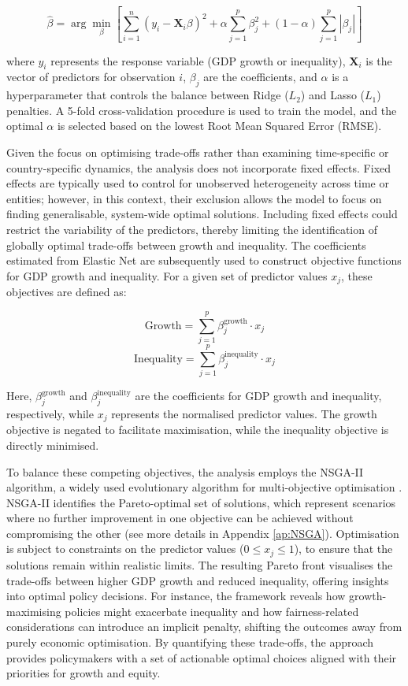 \documentclass[12pt]{article}
\begin{document}
\[
\hat{\beta} = \arg \min_{\beta} \left[ \sum_{i=1}^{n} \left( y_i - \mathbf{X}_i \beta \right)^2 + \alpha \sum_{j=1}^{p} \beta_j^2 + (1-\alpha) \sum_{j=1}^{p} |\beta_j| \right]
\]

where \(y_i\) represents the response variable (GDP growth or inequality), \(\mathbf{X}_i\) is the vector of predictors for observation \(i\), \(\beta_j\) are the coefficients, and \(\alpha\) is a hyperparameter that controls the balance between Ridge (\(L_2\)) and Lasso (\(L_1\)) penalties. A 5-fold cross-validation procedure is used to train the model, and the optimal \(\alpha\) is selected based on the lowest Root Mean Squared Error (RMSE).

Given the focus on optimising trade-offs rather than examining time-specific or country-specific dynamics, the analysis does not incorporate fixed effects. Fixed effects are typically used to control for unobserved heterogeneity across time or entities; however, in this context, their exclusion allows the model to focus on finding generalisable, system-wide optimal solutions. Including fixed effects could restrict the variability of the predictors, thereby limiting the identification of globally optimal trade-offs between growth and inequality. The coefficients estimated from Elastic Net are subsequently used to construct objective functions for GDP growth and inequality. For a given set of predictor values \(x_j\), these objectives are defined as:

\[
\text{Growth} = \sum_{j=1}^{p} \beta_{j}^{\text{growth}} \cdot x_j
\]
\[
\text{Inequality} = \sum_{j=1}^{p} \beta_{j}^{\text{inequality}} \cdot x_j
\]

Here, \(\beta_{j}^{\text{growth}}\) and \(\beta_{j}^{\text{inequality}}\) are the coefficients for GDP growth and inequality, respectively, while \(x_j\) represents the normalised predictor values. The growth objective is negated to facilitate maximisation, while the inequality objective is directly minimised.

To balance these competing objectives, the analysis employs the NSGA-II algorithm, a widely used evolutionary algorithm for multi-objective optimisation \parencite{murugan2009nsga}. NSGA-II identifies the Pareto-optimal set of solutions, which represent scenarios where no further improvement in one objective can be achieved without compromising the other (see more details in Appendix \ref{ap:NSGA}). Optimisation is subject to constraints on the predictor values (\(0 \leq x_j \leq 1\)), to ensure that the solutions remain within realistic limits. The resulting Pareto front visualises the trade-offs between higher GDP growth and reduced inequality, offering insights into optimal policy decisions. For instance, the framework reveals how growth-maximising policies might exacerbate inequality and how fairness-related considerations can introduce an implicit penalty, shifting the outcomes away from purely economic optimisation. By quantifying these trade-offs, the approach provides policymakers with a set of actionable optimal choices aligned with their priorities for growth and equity.
\end{document}
